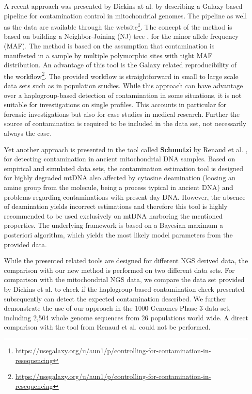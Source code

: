 A recent approach was presented by Dickins at al. \cite{Dickins2014} by describing a Galaxy \cite{Goecks2010,Afgan2016} based pipeline for contamination control in mitochondrial genomes. The pipeline as well as the data are available through the website\footnote{\url{https://usegalaxy.org/u/aun1/p/controlling-for-contamination-in-resequencing}}.  The concept of the method is based on building a Neighbor-Joining (NJ) tree \cite{Saitou1987}, for the minor allele frequency (MAF). The method is based on the assumption that contamination is manifested in a sample by multiple polymorphic sites with tight MAF distribution. An advantage of this tool is the Galaxy related reproducibility of the workflow\footnote{\url{https://usegalaxy.org/u/aun1/p/controlling-for-contamination-in-resequencing}}. The provided workflow is straightforward in small to large scale data sets such as in population studies. While this approach can have advantage over a haplogroup-based detection of contamination in some situations, it is not suitable for investigations on single profiles.  This accounts in particular for forensic investigations but also for case studies in medical research. Further the source of contamination is required to be included in the data set, not necessarily always the case.

Yet another approach is presented in the tool called \textbf{Schmutzi} by Renaud et al. \cite{Renaud2015}, for detecting contamination in ancient mitochondrial DNA samples. Based on empirical and simulated data sets, the contamination estimation tool is designed for highly degraded mtDNA also affected by cytosine deamination (loosing an amine group from the molecule, being  a process typical in ancient DNA) and problems regarding contaminations with present day DNA.  However, the absence of deamination yields incorrect estimations and therefore this tool is highly recommended to be used exclusively on mtDNA harboring the mentioned properties. The underlying framework is based on a Bayesian maximum a posteriori algorithm, which yields the most likely model parameters from the provided data. 

While the presented related tools are designed for different NGS derived data, the comparison with our new method is performed on two different data sets. For comparison with the mitochondrial NGS data, we compare the data set provided by Dickins et al. \cite{Dickins2014} to check if the haplogroup-based contamination check presented subsequently can detect the expected contamination described. We further demonstrate the use of our approach in the 1000 Genomes Phase 3 data set, including 2,504 whole genome sequences from 26 populations world wide. A direct comparison with the tool from Renaud et al. could not be performed.


